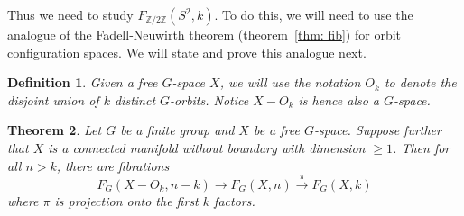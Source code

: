 \documentclass{amsart}
\newtheorem{thm}{Theorem}[section]
\newtheorem{defn}[thm]{Definition}
\begin{document}
Thus we need to study $F_{\mathbb{Z}/2\mathbb{Z}}(S^2,k)$. To do
this, we will need to use the analogue of the Fadell-Neuwirth theorem
(theorem~\ref{thm: fib}) for orbit configuration spaces. We will
state and prove this analogue next.

\begin{defn}
Given a free $G$-space $X$, 
we will use the notation $O_k$ to denote the disjoint union
of $k$ distinct $G$-orbits. Notice $X-O_k$ is hence also
a $G$-space.
\end{defn}

\begin{thm}
Let $G$ be a finite group and $X$ be a free $G$-space. Suppose
further that $X$ is a connected manifold without boundary with
dimension $\geq 1$.
Then 
for all $n > k$, there
are fibrations
$$
F_G(X-O_k,n-k) \rightarrow F_G(X,n) \overset{\pi}{\rightarrow} F_G(X,k)
$$
where $\pi$ is projection onto the first $k$ factors.
\end{thm}
\label{thm: orbit fib}
\end{document}
